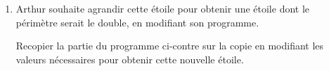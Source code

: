 \parbox{0.58\linewidth}{\begin{enumerate}[resume]
\item Arthur souhaite agrandir cette étoile pour obtenir une étoile dont le périmètre serait le double, en modifiant son programme.

Recopier la partie du programme ci-contre sur
la copie en modifiant les valeurs nécessaires
pour obtenir cette nouvelle étoile.
\end{enumerate}}\hfill\parbox{0.38\linewidth}{\begin{scratch}
     { 
    }
\end{scratch}}

\bigskip

